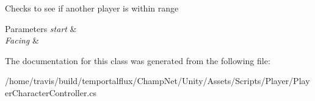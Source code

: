 Checks to see if another player is within range 


\begin{DoxyParams}{Parameters}
{\em start} & \\
\hline
{\em Facing} & \\
\hline
\end{DoxyParams}


The documentation for this class was generated from the following file\-:\begin{DoxyCompactItemize}
\item 
/home/travis/build/temportalflux/\-Champ\-Net/\-Unity/\-Assets/\-Scripts/\-Player/Player\-Character\-Controller.\-cs\end{DoxyCompactItemize}
